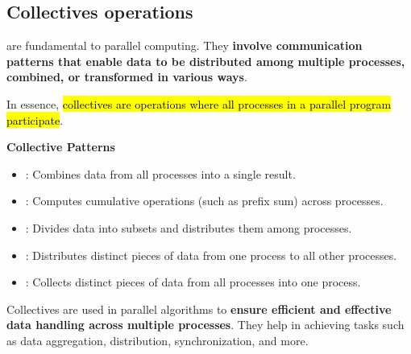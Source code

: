 \subsection{Collectives operations}

 are fundamental to parallel computing. They \textbf{involve communication patterns that enable data to be distributed among multiple processes, combined, or transformed in various ways}. 

\highspace
In essence, \hl{collectives are operations where all processes in a parallel program participate}.

\highspace
\begin{flushleft}
    \textcolor{Green3}{ \textbf{Collective Patterns}}
\end{flushleft}
\begin{itemize}
    \item {}: Combines data from all processes into a single result.

    \item {}: Computes cumulative operations (such as prefix sum) across processes.

    \item {}: Divides data into subsets and distributes them among processes.

    \item {}: Distributes distinct pieces of data from one process to all other processes.

    \item {}: Collects distinct pieces of data from all processes into one process.
\end{itemize}
Collectives are used in parallel algorithms to \textbf{ensure efficient and effective data handling across multiple processes}. They help in achieving tasks such as data aggregation, distribution, synchronization, and more.